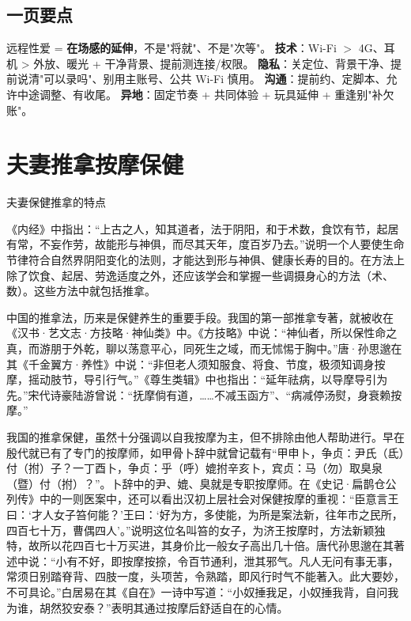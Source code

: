 \documentclass[12pt,UTF8,openany]{ctexbook}
\begin{document}
\section{一页要点}
远程性爱 = \textbf{在场感的延伸}，不是"将就"、不是"次等"。
\textbf{技术}：Wi-Fi $>$ 4G、耳机 > 外放、暖光 + 干净背景、提前测连接/权限。
\textbf{隐私}：关定位、背景干净、提前说清"可以录吗"、别用主账号、公共 Wi-Fi 慎用。
\textbf{沟通}：提前约、定脚本、允许中途调整、有收尾。
\textbf{异地}：固定节奏 + 共同体验 + 玩具延伸 + 重逢别"补欠账"。




\clearpage
\chapter{夫妻推拿按摩保健}


夫妻保健推拿的特点


《内经》中指出：“上古之人，知其道者，法于阴阳，和于术数，食饮有节，起居有常，不妄作劳，故能形与神俱，而尽其天年，度百岁乃去。”说明一个人要使生命节律符合自然界阴阳变化的法则，才能达到形与神俱、健康长寿的目的。在方法上除了饮食、起居、劳逸适度之外，还应该学会和掌握一些调摄身心的方法（术、数）。这些方法中就包括推拿。

中国的推拿法，历来是保健养生的重要手段。我国的第一部推拿专著，就被收在《汉书·艺文志·方技略·神仙类》中。《方技略》中说：“神仙者，所以保性命之真，而游朋于外乾，聊以荡意平心，同死生之域，而无怵惕于胸中。”唐·孙思邈在其《千金翼方·养性》中说：“非但老人须知服食、将食、节度，极须知调身按摩，摇动肢节，导引行气。”《尊生类辑》中也指出：“延年祛病，以导摩导引为先。”宋代诗豪陆游曾说：“抚摩倘有道，……不减玉函方”、“病减停汤熨，身衰赖按摩。”

我国的推拿保健，虽然十分强调以自我按摩为主，但不排除由他人帮助进行。早在殷代就已有了专门的按摩师，如甲骨卜辞中就曾记载有“甲申卜，争贞：尹氏（氐）付（拊）子？一丁酉卜，争贞：乎（呼）媲拊辛亥卜，宾贞：马（勿）取臭泉（暨）付（拊）？”。卜辞中的尹、媲、臭就是专职按摩师。在《史记·扁鹊仓公列传》中的一则医案中，还可以看出汉初上层社会对保健按摩的重视：“臣意言王曰：‘才人女子笞何能？’王曰：‘好为方，多使能，为所是案法新，往年市之民所，四百七十万，曹偶四人’。”说明这位名叫笞的女子，为济王按摩时，方法新颖独特，故所以花四百七十万买进，其身价比一般女子高出几十倍。唐代孙思邈在其著述中说：“小有不好，即按摩按捺，令百节通利，泄其邪气。凡人无问有事无事，常须日别踏脊背、四肢一度，头项苦，令熟踏，即风行时气不能著入。此大要妙，不可具论。”白居易在其《自在》一诗中写道：“小奴捶我足，小奴捶我背，自问我为谁，胡然狡安泰？”表明其通过按摩后舒适自在的心情。
\end{document}
